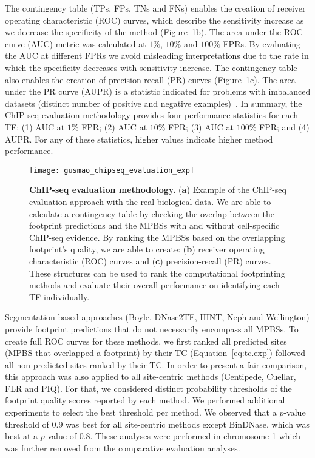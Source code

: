 The contingency table (TPs, FPs, TNs and FNs) enables the creation of receiver operating characteristic (ROC) curves, which describe the sensitivity increase as we decrease the specificity of the method (Figure~\ref{fig:gusmao_chipseq_evaluation_exp}b). The area under the ROC curve (AUC) metric was calculated at $1\%$, $10\%$ and $100\%$ FPRs. By evaluating the AUC at different FPRs we avoid misleading interpretations due to the rate in which the specificity decreases with sensitivity increase. The contingency table also enables the creation of precision-recall (PR) curves (Figure~\ref{fig:gusmao_chipseq_evaluation_exp}c). The area under the PR curve (AUPR) is a statistic indicated for problems with imbalanced datasets (distinct number of positive and negative examples)~\citep{davis2006,fawcett2006}. In summary, the ChIP-seq evaluation methodology provides four performance statistics for each TF: (1) AUC at $1\%$ FPR; (2) AUC at $10\%$ FPR; (3) AUC at $100\%$ FPR; and (4) AUPR. For any of these statistics, higher values indicate higher method performance.

\begin{figure}[h!]
\centering
\texttt{[image: gusmao\_chipseq\_evaluation\_exp]}
\caption[ChIP-seq evaluation methodology]{\textbf{ChIP-seq evaluation methodology.} (\textbf{a}) Example of the ChIP-seq evaluation approach with the real biological data. We are able to calculate a contingency table by checking the overlap between the footprint predictions and the MPBSs with and without cell-specific ChIP-seq evidence. By ranking the MPBSs based on the overlapping footprint's quality, we are able to create: (\textbf{b}) receiver operating characteristic (ROC) curves and (\textbf{c}) precision-recall (PR) curves. These structures can be used to rank the computational footprinting methods and evaluate their overall performance on identifying each TF individually.}
\label{fig:gusmao_chipseq_evaluation_exp}
\end{figure}

Segmentation-based approaches (Boyle, DNase2TF, HINT, Neph and Wellington) provide footprint predictions that do not necessarily encompass all MPBSs. To create full ROC curves for these methods, we first ranked all predicted sites (MPBS that overlapped a footprint) by their TC (Equation~\ref{eq:tc.exp}) followed all non-predicted sites ranked by their TC. In order to present a fair comparison, this approach was also applied to all site-centric methods (Centipede, Cuellar, FLR and PIQ). For that, we considered distinct probability thresholds of the footprint quality scores reported by each method. We performed additional experiments to select the best threshold per method. We observed that a $p$-value threshold of $0.9$ was best for all site-centric methods except BinDNase, which was best at a $p$-value of $0.8$. These analyses were performed in chromosome-1 which was further removed from the comparative evaluation analyses.

